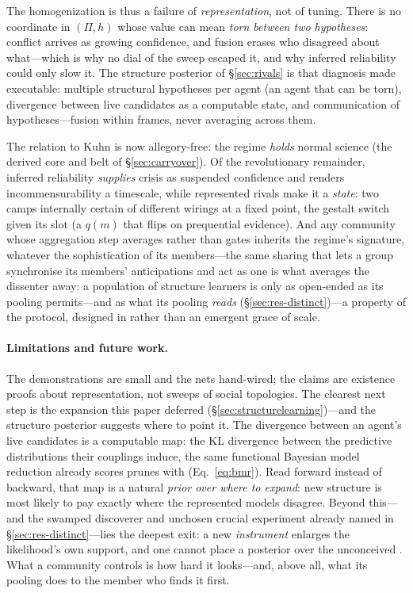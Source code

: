 \documentclass[runningheads]{llncs}
\begin{document}
The homogenization is thus a failure of \emph{representation}, not of tuning. There is no
coordinate in $(\Pi,h)$ whose value can mean \emph{torn between two hypotheses}: conflict
arrives as growing confidence, and fusion erases who disagreed about what---which is why no
dial of the sweep escaped it, and why inferred reliability could only slow it. The structure
posterior of \S\ref{sec:rivals} is that diagnosis made executable: multiple structural
hypotheses per agent (an agent that can be torn), divergence between live candidates as a
computable state, and communication of hypotheses---fusion within frames, never averaging
across them.

The relation to Kuhn is now allegory-free: the regime \emph{holds} normal science (the derived
core and belt of \S\ref{sec:carryover}).
Of the revolutionary remainder, inferred reliability \emph{supplies} crisis as suspended
confidence and renders incommensurability \citep{kuhn1983} a timescale, while represented
rivals make it a \emph{state}: two camps internally certain of different wirings at a fixed
point, the gestalt switch given its slot (a $q(m)$ that flips on prequential evidence). And
any community whose aggregation step averages rather than gates inherits the regime's
signature, whatever the sophistication of its members---the same sharing that lets a group
synchronise its members' anticipations and act as one \citep{albarracin2024protentions} is
what averages the dissenter away: a population of structure learners is
only as open-ended as its pooling permits---and as what its pooling \emph{reads}
(\S\ref{sec:res-distinct})---a property of the protocol, designed in rather than an emergent
grace of scale.

\paragraph{Limitations and future work.}
The demonstrations are small and the nets hand-wired; the claims are existence proofs about
representation, not sweeps of social topologies. The clearest next step is the expansion this
paper deferred (\S\ref{sec:structurelearning})---and the structure posterior suggests where
to point it. The divergence between an agent's live candidates is a computable map: the KL
divergence between the predictive distributions their couplings induce, the same functional
Bayesian model reduction already scores prunes with (Eq.~\ref{eq:bmr}). Read forward instead
of backward, that map is a natural \emph{prior over where to expand}: new structure is most
likely to pay exactly where the represented models disagree. Beyond this---and the swamped
discoverer and unchosen crucial experiment already named in \S\ref{sec:res-distinct}---lies the
deepest exit: a new \emph{instrument} enlarges the likelihood's own support, and one cannot
place a posterior over the unconceived \citep{stanford2006}. What a community controls is how
hard it looks---and, above all, what its pooling does to the member who finds it first.
\end{document}
